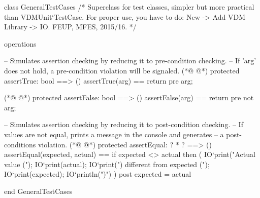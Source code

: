\begin{vdmpp}[breaklines=true]
class GeneralTestCases
/*
  Superclass for test classes, simpler but more practical than VDMUnit`TestCase. 
  For proper use, you have to do: New -> Add VDM Library -> IO.
  FEUP, MFES, 2015/16.
*/

operations

 -- Simulates assertion checking by reducing it to pre-condition checking.
 -- If 'arg' does not hold, a pre-condition violation will be signaled.
(*@
\label{assertTrue:12}
@*)
 protected assertTrue: bool ==> ()
 assertTrue(arg) == 
  return 
 pre arg;
  
(*@
\label{assertFalse:17}
@*)
  protected assertFalse: bool ==> ()
 assertFalse(arg) == 
  return 
 pre not arg;
 
 -- Simulates assertion checking by reducing it to post-condition checking.
 -- If values are not equal, prints a message in the console and generates 
 -- a post-conditions violation.
(*@
\label{assertEqual:25}
@*)
 protected assertEqual: ? * ? ==> ()
 assertEqual(expected, actual) == 
  if expected <> actual then (
    IO`print("Actual value (");
    IO`print(actual); 
    IO`print(") different from expected (");
    IO`print(expected);
    IO`println(")\n")
  )
 post expected = actual
 
end GeneralTestCases
\end{vdmpp}
